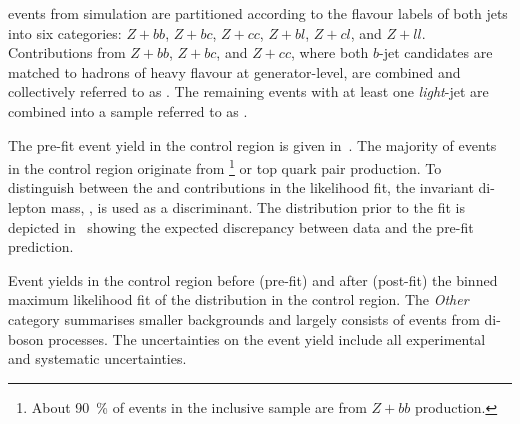 \Zjets events from simulation are partitioned according to the flavour
labels of both \btagged jets into six categories: $Z + bb$, $Z + bc$,
$Z + cc$, $Z + bl$, $Z + cl$, and $Z + ll$. Contributions from
$Z + bb$, $Z + bc$, and $Z + cc$, where both $b$-jet candidates are
matched to hadrons of heavy flavour at generator-level, are combined
and collectively referred to as \ZHF. The remaining \Zjets events with
at least one \emph{light}-jet are combined into a sample referred to
as \ZLF.

The pre-fit event yield in the \ZHF control region is given
in~. The majority of events in the control region
originate from \ZHF\footnote{About \SI{90}{\percent} of events in the
  inclusive \ZHF sample are from $Z + bb$ production.} or top quark
pair production.
To distinguish between the \ZHF and \ttbar contributions in the
likelihood fit, the invariant di-lepton mass, \mll, is used as a
discriminant. The \mll distribution prior to the fit is depicted
in~ showing the expected discrepancy between
data and the pre-fit prediction.

\begin{table}[htbp]
  \centering

  \caption{Event yields in the \ZHF control region before (pre-fit)
    and after (post-fit) the binned maximum likelihood fit of the \mll
    distribution in the control region. The \emph{Other} category
    summarises smaller backgrounds and largely consists of events from
    di-boson processes. The uncertainties on the event yield include
    all experimental and systematic uncertainties.}%
  \label{tab:zcr_yields}

  
\end{table}


